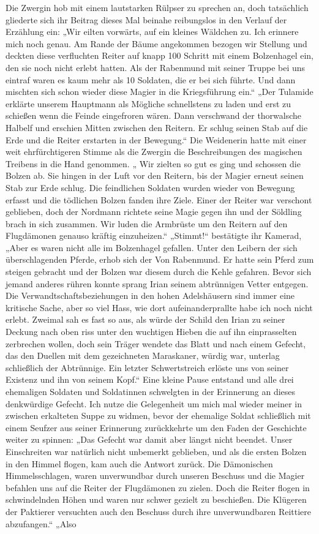 Die Zwergin hob mit einem lautstarken Rülpser zu sprechen an, doch tatsächlich gliederte sich ihr Beitrag dieses Mal beinahe reibungslos in den Verlauf der Erzählung ein: „Wir eilten vorwärts, auf ein kleines Wäldchen zu. Ich erinnere mich noch genau. Am Rande der Bäume angekommen bezogen wir Stellung und deckten diese verfluchten Reiter auf knapp 100 Schritt mit einem Bolzenhagel ein, den sie noch nicht erlebt hatten. Als der Rabenmund mit seiner Truppe bei uns eintraf waren es kaum mehr als 10 Soldaten, die er bei sich führte. Und dann mischten sich schon wieder diese Magier in die Kriegsführung ein.“ „Der Tulamide erklärte unserem Hauptmann als Mögliche schnellstens zu laden und erst zu schießen wenn die Feinde eingefroren wären. Dann verschwand der thorwalsche Halbelf und erschien Mitten zwischen den Reitern. Er schlug seinen Stab auf die Erde und die Reiter erstarten in der Bewegung.“ Die Weidenerin hatte mit einer weit ehrfürchtigeren Stimme als die Zwergin die Beschreibungen des magischen Treibens in die Hand genommen. „ Wir zielten so gut es ging und schossen die Bolzen ab. Sie hingen in der Luft vor den Reitern, bis der Magier erneut seinen Stab zur Erde schlug. Die feindlichen Soldaten wurden wieder von Bewegung erfasst und die tödlichen Bolzen fanden ihre Ziele. Einer der Reiter war verschont geblieben, doch der Nordmann richtete seine Magie gegen ihn und der Söldling brach in sich zusammen. Wir luden die Armbrüste um den Reitern auf den Flugdämonen genauso kräftig einzuheizen.“ „Stimmt!“ bestätigte ihr Kamerad, „Aber es waren nicht alle im Bolzenhagel gefallen. Unter den Leibern der sich überschlagenden Pferde, erhob sich der Von Rabenmund. Er hatte sein Pferd zum steigen gebracht und der Bolzen war diesem durch die Kehle gefahren. Bevor sich jemand anderes rühren konnte sprang Irian seinem abtrünnigen Vetter entgegen. Die Verwandtschaftsbeziehungen in den hohen Adelshäusern sind immer eine kritische Sache, aber so viel Hass, wie dort aufeinanderprallte habe ich noch nicht erlebt. Zweimal sah es fast so aus, als würde der Schild den Irian zu seiner Deckung nach oben riss unter den wuchtigen Hieben die auf ihn einprasselten zerbrechen wollen, doch sein Träger wendete das Blatt und nach einem Gefecht, das den Duellen mit dem gezeichneten Maraskaner, würdig war, unterlag schließlich der Abtrünnige. Ein letzter Schwertstreich erlöste uns von seiner Existenz und ihn von seinem Kopf.“ Eine kleine Pause entstand und alle drei ehemaligen Soldaten und Soldatinnen schwelgten in der Erinnerung an dieses denkwürdige Gefecht. Ich nutze die Gelegenheit um mich mal wieder meiner in zwischen erkalteten Suppe zu widmen, bevor der ehemalige Soldat schließlich mit einem Seufzer aus seiner Erinnerung zurückkehrte um den Faden der Geschichte weiter zu spinnen: „Das Gefecht war damit aber längst nicht beendet. Unser Einschreiten war natürlich nicht unbemerkt geblieben, und als die ersten Bolzen in den Himmel flogen, kam auch die Antwort zurück. Die Dämonischen Himmelsschlagen, waren unverwundbar durch unseren Beschuss und die Magier befahlen uns auf die Reiter der Flugdämonen zu zielen. Doch die Reiter flogen in schwindelnden Höhen und waren nur schwer gezielt zu beschießen. Die Klügeren der Paktierer versuchten auch den Beschuss durch ihre unverwundbaren Reittiere abzufangen.“ „Also 